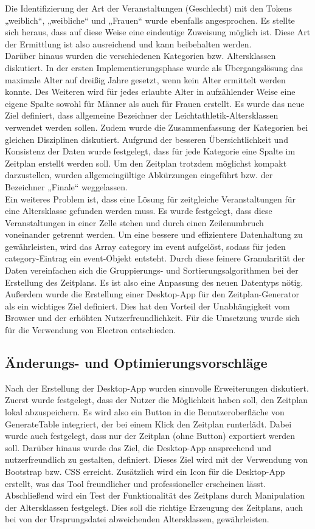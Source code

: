 Die Identifizierung der Art der Veranstaltungen (Geschlecht) mit den Tokens „weiblich“, „weibliche“ und „Frauen“ wurde ebenfalls angesprochen. Es stellte sich heraus, dass auf diese Weise eine eindeutige Zuweisung möglich ist. Diese Art der Ermittlung ist also ausreichend und kann beibehalten werden.\\
Darüber hinaus wurden die verschiedenen Kategorien bzw. Altersklassen diskutiert. In der ersten Implementierungsphase wurde als Übergangslösung das maximale Alter auf dreißig Jahre gesetzt, wenn kein Alter ermittelt werden konnte. Des Weiteren wird für jedes erlaubte Alter in aufzählender Weise eine eigene Spalte sowohl für Männer als auch für Frauen erstellt. Es wurde das neue Ziel definiert, dass allgemeine Bezeichner der Leichtathletik-Altersklassen verwendet werden sollen. Zudem wurde die Zusammenfassung der Kategorien bei gleichen Disziplinen diskutiert. Aufgrund der besseren Übersichtlichkeit und Konsistenz der Daten wurde festgelegt, dass für jede Kategorie eine Spalte im Zeitplan erstellt werden soll. Um den Zeitplan trotzdem möglichst kompakt darzustellen, wurden allgemeingültige Abkürzungen eingeführt bzw. der Bezeichner „Finale“ weggelassen. \\
Ein weiteres Problem ist, dass eine Lösung für zeitgleiche Veranstaltungen für eine Altersklasse gefunden werden muss. Es wurde festgelegt, dass diese Veranstaltungen in einer Zelle stehen und durch einen Zeilenumbruch voneinander getrennt werden. Um eine bessere und effizientere Datenhaltung zu gewährleisten, wird das Array category im event aufgelöst, sodass für jeden category-Eintrag ein event-Objekt entsteht. Durch diese feinere Granularität der Daten vereinfachen sich die Gruppierungs- und Sortierungsalgorithmen bei der Erstellung des Zeitplans. Es ist also eine Anpassung des neuen Datentyps nötig.\\
Außerdem wurde die Erstellung einer Desktop-App für den Zeitplan-Generator als ein wichtiges Ziel definiert. Dies hat den Vorteil der Unabhängigkeit vom Browser und der erhöhten Nutzerfreundlichkeit. Für die Umsetzung wurde sich für die Verwendung von Electron entschieden.

\subsection{Änderungs- und Optimierungsvorschläge}
Nach der Erstellung der Desktop-App wurden sinnvolle Erweiterungen diskutiert. Zuerst wurde festgelegt, dass der Nutzer die Möglichkeit haben soll, den Zeitplan lokal abzuspeichern. Es wird also ein Button in die Benutzeroberfläche von GenerateTable integriert, der bei einem Klick den Zeitplan runterlädt. Dabei wurde auch festgelegt, dass nur der Zeitplan (ohne Button) exportiert werden soll.
Darüber hinaus wurde das Ziel, die Desktop-App ansprechend und nutzerfreundlich zu gestalten, definiert. Dieses Ziel wird mit der Verwendung von Bootstrap bzw. CSS erreicht. Zusätzlich wird ein Icon für die Desktop-App erstellt, was das Tool freundlicher und professioneller erscheinen lässt.
Abschließend wird ein Test der Funktionalität des Zeitplans durch Manipulation der Altersklassen festgelegt. Dies soll die richtige Erzeugung des Zeitplans, auch bei von der Ursprungsdatei abweichenden Altersklassen, gewährleisten.

